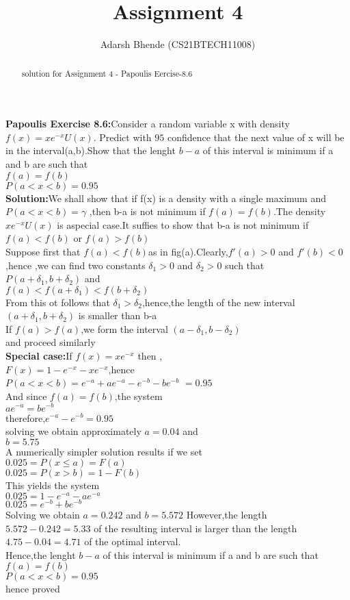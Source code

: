 \documentclass[journal,12pt,twocolumn]{IEEEtran}
\title{Assignment 4}
\author{ Adarsh Bhende (CS21BTECH11008)}
\theoremstyle{remark}
\begin{document}
\maketitle
\begin{abstract}
 solution for Assignment 4 - Papoulis Eercise-8.6
\end{abstract}
\textbf{Papoulis Exercise 8.6:}Consider a random variable x with density $f(x)=xe^{-x}U(x)$.
Predict with $95$ confidence that the next value of x will be in the interval(a,b).Show that the lenght $b-a$ of this interval is minimum if a and b are such that  \\
$f(a)= f(b)$   \\
$P(a<x<b)=0.95$\\
\textbf{Solution:}We shall show that if f(x) is a density with a single maximum and $P(a<x<b)=\gamma$
,then b-a is not minimum if $f(a)=f(b)$.The density $xe^{-x}U(x)$ is aspecial case.It suffies to show that b-a is not minimum if $f(a)<f(b)$ or $f(a)>f(b)$\\
Suppose first that $f(a)<f(b)$as in fig(a).Clearly,$f'(a)>0$ and $f'(b)<0$,hence ,we can find two constants $\delta_{1}>0$ and $\delta_{2}>0$ such that \\
$P(a+\delta_{1},b+\delta_{2})$ and\\
$f(a)<f(a+\delta_{1})<f(b+\delta_{2})$\\
From this ot follows that $\delta_{1} >\delta_{2}$,hence,the length of the new interval
 $(a+\delta_{1} ,b+\delta_{2})$ is smaller than b-a\\
 If $f(a) > f(a)$,we form the interval $(a-\delta_{1},b-\delta_{2})$\\
 and proceed similarly\\
 \textbf{Special case:}If $f(x)=xe^{-x}$ then ,\\
 $F(x)=1-e^{-x}-xe^{-x}$,hence\\

$ P(a<x<b)=e^{-a}+ae^{-a}-e^{-b}-be^{-b}$
 $=0.95$  \\
 And since $f(a)=f(b)$,the system\\
$ ae^{-a}=be^{-b}$\\
therefore,$e^{-a}-e^{-b}=0.95$\\
solving we obtain approximately $a=0.04$ and\\ $b=5.75$\\
A numerically simpler solution results if we set\\
$0.025=P(x\le a)=F(a)$ \\$0.025=P(x>b)=1-F(b)$\\
This yields the system\\
$0.025=1-e^{-a}-ae^{-a}$\\
$0.025=e^{-b}+be^{-b}$\\
Solving we obtain $a=0.242$ and $b=5.572$ However,the length $5.572-0.242=5.33$ of the resulting interval is larger than the length $4.75-0.04=4.71$ of the optimal  interval.\\
Hence,the lenght $b-a$ of this interval is minimum if a and b are such that  \\
$f(a)= f(b)$   \\
$P(a<x<b)=0.95$\\
hence proved
\end{document}
